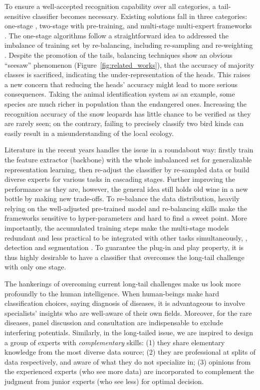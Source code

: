\documentclass[10pt,twocolumn,letterpaper]{article}
\begin{document}
To ensure a well-accepted recognition capability over all categories, a tail-sensitive classifier becomes necessary. Existing solutions fall in three categories: one-stage \cite{Huang_2016_CVPR, wang2017learning}, two-stage with pre-training\cite{kang2019decoupling, cao2019learning}, and multi-stage multi-expert frameworks \cite{xiang2020learning, wang2020long}. The one-stage algorithms follow a straightforward idea to addressed the imbalance of training set by re-balancing, including re-sampling \cite{kang2019decoupling} and re-weighting \cite{cao2019learning, cui2019class, zhang2017range}. Despite the promotion of the tails, balancing techniques show an obvious ``seesaw'' phenomenon (Figure~\ref{fig:related_works}), that the accuracy of majority classes is sacrificed, indicating the under-representation of the heads. This raises a new concern that reducing the heads' accuracy might lead to more serious consequences. Taking the animal identification system as an example, some species are much richer in population than the endangered ones. Increasing the recognition accuracy of the snow leopards has little chance to be verified as they are rarely seen; on the contrary, failing to precisely classify two bird kinds can easily result in a misunderstanding of the local ecology. 

Literature in the recent years \cite{kang2019decoupling, wang2020long, xiang2020learning, zhang2021bag} handles the issue in a roundabout way: firstly train the feature extractor (backbone) with the whole imbalanced set for generalizable representation learning, then re-adjust the classifier by re-sampled data or build diverse experts for various tasks in cascading stages. Further improving the performance as they are, however, the general idea still holds old wine in a new bottle by making new trade-offs. To re-balance the data distribution, heavily relying on the well-adjusted pre-trained model and re-balancing skills make the frameworks sensitive to hyper-parameters and hard to find a sweet point. More importantly, the accumulated training steps make the multi-stage models redundant and less practical to be integrated with other tasks simultaneously, \eg, detection \cite{wang2020devil} and segmentation \cite{zang2021fasa}. To guarantee the plug-in and play property, it is thus highly desirable to have a classifier that overcomes the long-tail challenge with only one stage.

The hankerings of overcoming current long-tail challenges make us look more profoundly to the human intelligence. When human-beings make hard classification choices, saying diagnosis of diseases, it is advantageous to involve specialists’ insights who are well-aware of their own fields. Moreover, for the rare diseases, panel discussion and consultation are indispensable to exclude interfering potentials. Similarly, in the long-tailed issue, we are inspired to design a group of experts with \textit{complementary} skills: (1) they share elementary knowledge from the most diverse data source; (2) they are professional at splits of data respectively, and aware of what they do not specialize in; (3) opinions from the experienced experts (who see more data) are incorporated to complement the judgment from junior experts (who see less) for optimal decision.
\end{document}
